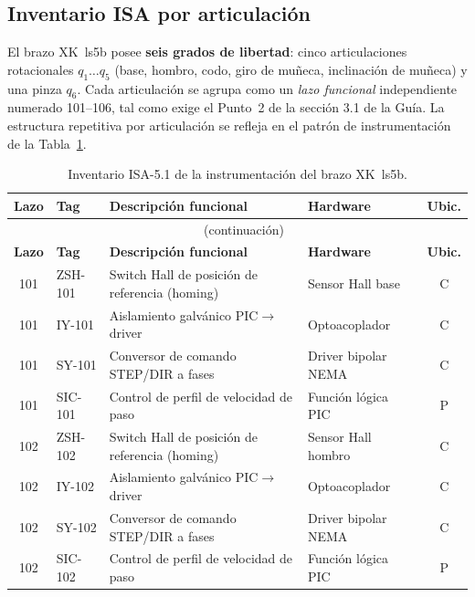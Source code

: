 \documentclass[11pt]{article}
\begin{document}
\subsection{Inventario ISA por articulación}
\label{subsec:inventario}

El brazo XK~ls5b posee \textbf{seis grados de libertad}: cinco articulaciones rotacionales $q_1\ldots q_5$ (base, hombro, codo, giro de muñeca, inclinación de muñeca) y una pinza $q_6$. Cada articulación se agrupa como un \emph{lazo funcional} independiente numerado 101–106, tal como exige el Punto~2 de la sección 3.1 de la Guía. La estructura repetitiva por articulación se refleja en el patrón de instrumentación de la Tabla~\ref{tab:inventario}.

\begin{longtable}{@{}c l p{5.4cm} l c@{}}
	\caption{Inventario ISA-5.1 de la instrumentación del brazo XK~ls5b.}
	\label{tab:inventario}\\
	\toprule
	\textbf{Lazo} & \textbf{Tag} & \textbf{Descripción funcional} & \textbf{Hardware} & \textbf{Ubic.} \\
	\midrule
	\endfirsthead
	\multicolumn{5}{c}{\tablename\ \thetable\ (continuación)}\\
	\toprule
	\textbf{Lazo} & \textbf{Tag} & \textbf{Descripción funcional} & \textbf{Hardware} & \textbf{Ubic.} \\
	\midrule
	\endhead
	\bottomrule
	\endfoot
	101 & ZSH-101 & Switch Hall de posición de referencia (homing) & Sensor Hall base   & C \\
	101 & IY-101  & Aislamiento galvánico PIC$\rightarrow$driver     & Optoacoplador       & C \\
	101 & SY-101  & Conversor de comando STEP/DIR a fases            & Driver bipolar NEMA & C \\
	101 & SIC-101 & Control de perfil de velocidad de paso           & Función lógica PIC  & P \\
	\midrule
	102 & ZSH-102 & Switch Hall de posición de referencia (homing) & Sensor Hall hombro & C \\
	102 & IY-102  & Aislamiento galvánico PIC$\rightarrow$driver     & Optoacoplador       & C \\
	102 & SY-102  & Conversor de comando STEP/DIR a fases            & Driver bipolar NEMA & C \\
	102 & SIC-102 & Control de perfil de velocidad de paso           & Función lógica PIC  & P \\

\end{longtable}
\end{document}

